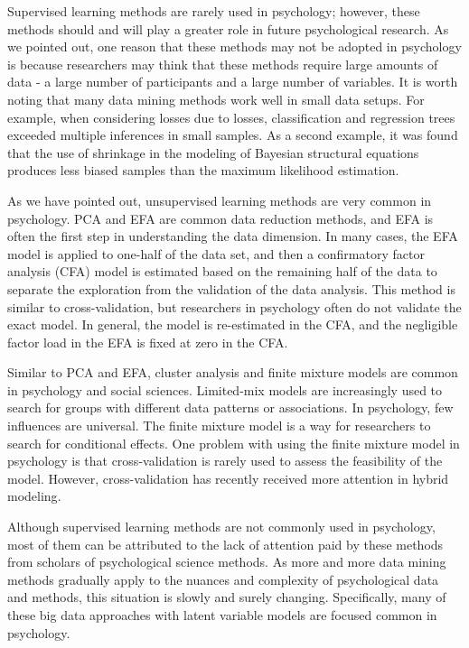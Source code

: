 Supervised learning methods are rarely used in psychology; however,
 these methods should and will play a greater role in future 
psychological research. As we pointed out, one reason that these 
methods may not be adopted in psychology is because researchers may
 think that these methods require large amounts of data - a large 
number of participants and a large number of variables. It is worth
 noting that many data mining methods work well in small data 
setups. For example, when considering losses due to losses, 
classification and regression trees exceeded multiple inferences in 
small samples. As a second example, it was found that the use of 
shrinkage in the modeling of Bayesian 
structural equations produces less biased samples than the maximum
 likelihood estimation\cite{editor11}.

As we have pointed out, unsupervised learning methods are very 
common in psychology. PCA and EFA are common data reduction 
methods, and EFA is often the first step in understanding the data
 dimension. In many cases, the EFA model is applied to one-half of
 the data set, and then a confirmatory factor analysis (CFA) model
 is estimated based on the remaining half of the data to separate 
the exploration from the validation of the data analysis. This 
method is similar to cross-validation, but researchers in 
psychology often do not validate the exact model. In general, the 
model is re-estimated in the CFA, and the negligible factor load 
in the EFA is fixed at zero in the CFA\cite{editor11}.

Similar to PCA and EFA, cluster analysis and finite mixture models
 are common in psychology and social sciences. Limited-mix models 
are increasingly used to search for groups with different data 
patterns or associations. In psychology, few influences are 
universal. The finite mixture model is a way for researchers to 
search for conditional effects. One problem with using the finite 
mixture model in psychology is that cross-validation is rarely used
 to assess the feasibility of the model. However, cross-validation
 has recently received more attention in hybrid modeling\cite{editor11}.

Although supervised learning methods are not commonly used in 
psychology, most of them can be attributed to the lack of attention
 paid by these methods from scholars of psychological science 
methods. As more and more data mining methods gradually apply to 
the nuances and complexity of psychological data and methods\cite{editor11}, 
this situation is 
slowly and surely changing. Specifically, many of these big data 
approaches with latent variable models are focused common in psychology.

